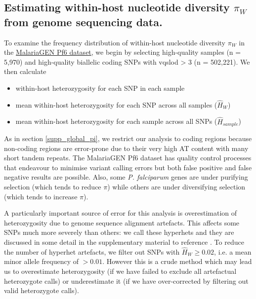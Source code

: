 \documentclass[_main.tex]{subfiles}
\begin{document}

\subsection{Estimating within-host nucleotide diversity \texorpdfstring{$\pi_W$}{pi-w} from genome sequencing data.}
\label{supp_Q_pi}

To examine the frequency distribution of within-host nucleotide diversity $\pi_W$ in the \href{https://www.malariagen.net/resource/26}{MalariaGEN Pf6 dataset}, we begin by selecting high-quality samples (n = 5,970) and high-quality biallelic coding SNPs with vqslod > 3 (n = 502,221).   We then calculate

\begin{itemize}[noitemsep]

\item within-host heterozygosity for each SNP in each sample

\item mean within-host heterozygosity for each SNP across all samples ($\widehat{H}_W$)

\item mean within-host heterozygosity for each sample across all SNPs ($\widehat{H}_{sample}$)

\end{itemize}

As in section \ref{supp_global_pi}, we restrict our analysis to coding regions because non-coding regions are error-prone due to their very high AT content with many short tandem repeats.  The MalariaGEN Pf6 dataset has quality control processes that endeavour to minimise variant calling errors but both false positive and false negative results are possible. Also, some \textit{P. falciparum} genes are under purifying selection (which tends to reduce $\pi$) while others are under diversifying selection (which tends to increase $\pi$).  

A particularly important source of error for this analysis is overestimation of heterozygosity due to genome sequence alignment artefacts.  This affects some SNPs much more severely than others: we call these hyperhets and they are discussed in some detail in the supplementary material to reference \cite{Manske2012}.  To reduce the number of hyperhet artefacts, we filter out SNPs with $\widehat{H}_W \ge 0.02$, i.e. a mean minor allele frequency of $>0.01$.   However this is a crude method which may lead us to overestimate heterozygosity (if we have failed to exclude all artefactual heterozygote calls) or underestimate it (if we have over-corrected by filtering out valid heterozygote calls).
\end{document}
